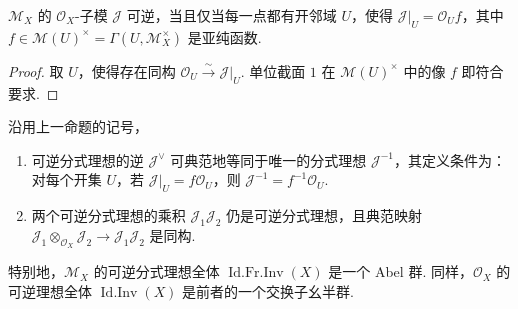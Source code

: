 \begin{proposition}\label{item:ag-1-1-7}
$\mathcal M_X$ 的 $\mathcal O_X$-子模 $\mathcal J$ 可逆，当且仅当每一点都有开邻域 $U$，使得 $\mathcal J|_U=\mathcal O_Uf$，其中 $f\in\mathcal M(U)^\times=\Gamma(U,\mathcal M_X^\times)$ 是亚纯函数.
\end{proposition}
\begin{proof}
取 $U$，使得存在同构 $\mathcal O_U\xrightarrow\sim\mathcal J|_U$. 单位截面 $1$ 在 $\mathcal M(U)^\times$ 中的像 $f$ 即符合要求.
\end{proof}
\begin{corollary}\label{item:ag-1-1-8}
沿用上一命题的记号，
\begin{enumerate}[label=\roman*)]
\item 可逆分式理想的逆 $\mathcal J^\vee$ 可典范地等同于唯一的分式理想 $\mathcal J^{-1}$，其定义条件为：对每个开集 $U$，若 $\mathcal J|_U=f\mathcal O_U$，则 $\mathcal J^{-1}=f^{-1}\mathcal O_U$.
\item 两个可逆分式理想的乘积 $\mathcal J_1\mathcal J_2$ 仍是可逆分式理想，且典范映射 $\mathcal J_1\otimes_{\mathcal O_X}\mathcal J_2\longrightarrow\mathcal J_1\mathcal J_2$ 是同构.
\end{enumerate}
\end{corollary}
特别地，$\mathcal M_X$ 的可逆分式理想全体 $\operatorname{Id.Fr.Inv}(X)$ 是一个 Abel 群. 同样，$\mathcal O_X$ 的可逆理想全体 $\operatorname{Id.Inv}(X)$ 是前者的一个交换子幺半群.

